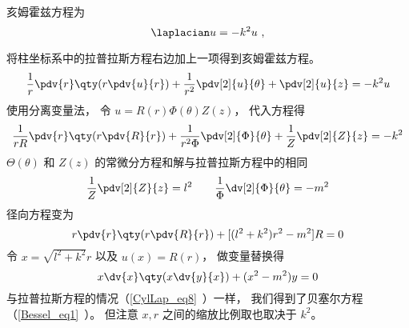 
\begin{issues}
\issueDraft
\end{issues}


亥姆霍兹方程为
\begin{equation}
\laplacian u = -k^2 u~,
\end{equation}

将柱坐标系中的拉普拉斯方程右边加上一项得到亥姆霍兹方程。
\begin{equation}
\frac{1}{r} \pdv{r} \qty(r\pdv{u}{r}) + \frac{1}{r^2} \pdv[2]{u}{\theta} + \pdv[2]{u}{z} = -k^2 u
\end{equation}
使用分离变量法， 令 $u = R(r) \Phi(\theta) Z(z)$， 代入方程得
\begin{equation}
\frac{1}{rR}\pdv{r} \qty(r\pdv{R}{r}) + \frac{1}{r^2 \Phi} \pdv[2]{\Phi}{\theta} + \frac{1}{Z} \pdv[2]{Z}{z} = -k^2
\end{equation}
$\Theta(\theta)$ 和 $Z(z)$ 的常微分方程和解与拉普拉斯方程中的相同
\begin{equation}
\frac{1}{Z} \pdv[2]{Z}{z} = l^2 \qquad
\frac{1}{\Phi} \dv[2]{\Phi}{\theta} = -m^2
\end{equation}
径向方程变为
\begin{equation}
r\pdv{r} \qty(r\pdv{R}{r}) + [(l^2 + k^2)r^2 - m^2]R  = 0
\end{equation}
令 $x = \sqrt{l^2 + k^2}r$ 以及 $u(x) = R(r)$， 做变量替换得
\begin{equation}\label{CylHlm_eq1}
x \dv{x} \qty(x\dv{y}{x}) + (x^2 - m^2)y = 0
\end{equation}
与拉普拉斯方程的情况（\autoref{CylLap_eq8}~）一样， 我们得到了贝塞尔方程（\autoref{Bessel_eq1}~）。 但注意 $x, r$ 之间的缩放比例取也取决于 $k^2$。
